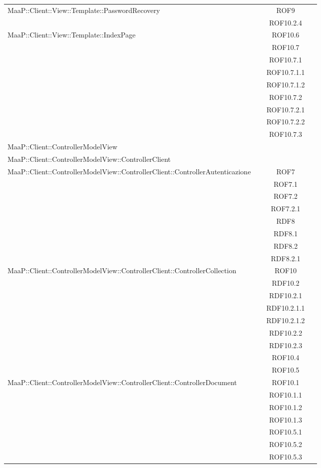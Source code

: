 \begin{center}
\begin{longtable}{|p{0.8\linewidth}|c|}
\midrule 
MaaP::Client::View::Template::PasswordRecovery
& ROF9\\
& ROF10.2.4\\

\midrule 
MaaP::Client::View::Template::IndexPage
& ROF10.6\\
& ROF10.7\\
& ROF10.7.1\\
& ROF10.7.1.1\\
& ROF10.7.1.2\\
& ROF10.7.2\\
& ROF10.7.2.1\\
& ROF10.7.2.2\\
& ROF10.7.3\\

\midrule 
MaaP::Client::ControllerModelView
& \\

\midrule 
MaaP::Client::ControllerModelView::ControllerClient
& \\

\midrule 
MaaP::Client::ControllerModelView::ControllerClient::ControllerAutenticazione
& ROF7\\
& ROF7.1\\
& ROF7.2\\
& ROF7.2.1\\
& RDF8\\
& RDF8.1\\
& RDF8.2\\
& RDF8.2.1\\

\midrule 
MaaP::Client::ControllerModelView::ControllerClient::ControllerCollection
& ROF10\\
& RDF10.2\\
& RDF10.2.1\\
& RDF10.2.1.1\\
& RDF10.2.1.2\\
& RDF10.2.2\\
& RDF10.2.3\\
& ROF10.4\\
& ROF10.5\\


\midrule 
MaaP::Client::ControllerModelView::ControllerClient::ControllerDocument
& ROF10.1\\
& ROF10.1.1\\
& ROF10.1.2\\
& ROF10.1.3\\
& ROF10.5.1\\
& ROF10.5.2\\
& ROF10.5.3\\



\end{longtable}
\end{center}

